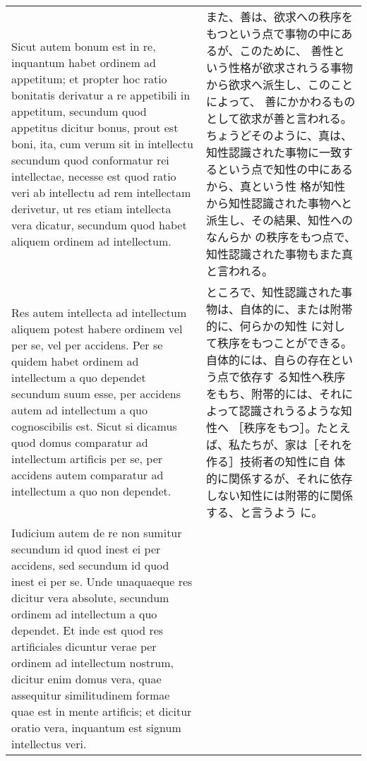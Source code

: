 \documentclass[10pt]{jsarticle} %
\begin{document}
\begin{longtable}{p{21em}p{21em}}
\\


\hspace{1em}Sicut autem bonum est in re, inquantum habet ordinem ad
appetitum; et propter hoc ratio bonitatis derivatur a re appetibili in
appetitum, secundum quod appetitus dicitur bonus, prout est boni, ita,
cum verum sit in intellectu secundum quod conformatur rei intellectae,
necesse est quod ratio veri ab intellectu ad rem intellectam derivetur,
ut res etiam intellecta vera dicatur, secundum quod habet aliquem
ordinem ad intellectum. 


&

また、善は、欲求への秩序をもつという点で事物の中にあるが、このために、
 善性という性格が欲求されうる事物から欲求へ派生し、このことによって、
 善にかかわるものとして欲求が善と言われる。ちょうどそのように、真は、
 知性認識された事物に一致するという点で知性の中にあるから、真という性
 格が知性から知性認識された事物へと派生し、その結果、知性へのなんらか
 の秩序をもつ点で、知性認識された事物もまた真と言われる。


\\

\hspace{1em}Res autem intellecta ad intellectum aliquem potest habere
ordinem vel per se, vel per accidens. Per se quidem habet ordinem ad
intellectum a quo dependet secundum suum esse, per accidens autem ad
intellectum a quo cognoscibilis est. Sicut si dicamus quod domus
comparatur ad intellectum artificis per se, per accidens autem
comparatur ad intellectum a quo non dependet.


&

ところで、知性認識された事物は、自体的に、または附帯的に、何らかの知性
に対して秩序をもつことができる。自体的には、自らの存在という点で依存す
る知性へ秩序をもち、附帯的には、それによって認識されうるような知性へ
［秩序をもつ］。たとえば、私たちが、家は［それを作る］技術者の知性に自
体的に関係するが、それに依存しない知性には附帯的に関係する、と言うよう
に。


\\


Iudicium autem de re non sumitur secundum id quod inest ei per
accidens, sed secundum id quod inest ei per se. Unde unaquaeque res
dicitur vera absolute, secundum ordinem ad intellectum a quo
dependet. Et inde est quod res artificiales dicuntur verae per ordinem
ad intellectum nostrum, dicitur enim domus vera, quae assequitur
similitudinem formae quae est in mente artificis; et dicitur oratio
vera, inquantum est signum intellectus veri.


\end{longtable}
\end{document}
